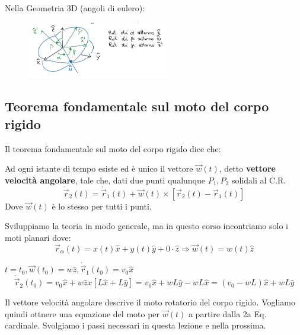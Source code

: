 \hspace{-15pt}Nella Geometria 3D (angoli di eulero):
\begin{figure}[h!]
    \centering
    \includegraphics[width=0.55\textwidth]{images/geo-3d.png}
\end{figure}

\subsection{Teorema fondamentale sul moto del corpo rigido}
Il teorema fondamentale sul moto del corpo rigido dice che:
\begin{theorem}
    Ad ogni istante di tempo esiste ed è unico il vettore $\vec{w}(t)$, detto \textbf{vettore velocità angolare}, tale che, dati due punti qualunque $P_1, P_2$
    solidali al C.R.
    $$\dot{\vec{r}}_2(t) = \dot{\vec{r}}_1(t) + \vec{w}(t) \times [\vec{r}_2(t) - \vec{r}_1(t)]$$
    Dove $\vec{w}(t)$ è lo stesso per tutti i punti.
\end{theorem}
\hspace{-15pt}Sviluppiamo la teoria in modo generale, ma in questo corso incontriamo solo i moti planari dove:
$$\vec{r}_{\alpha}(t) = x(t) \hat{x} + y(t)\hat{y} + 0 \cdot \hat{z} \Rightarrow \vec{w}(t) = w(t) \hat{z}$$
\begin{example}
    $t= t_0, \vec{w}(t_0) = w\hat{z}, \dot{\vec{r}}_1(t_0) = v_0\hat{x}$
    $$\dot{\vec{r}}_2(t_0) = v_0\hat{x} + w\hat{z}x[L\hat{x}+ L\hat{y}] = v_0\hat{x} + wL\hat{y} - wL\hat{x} = (v_0 - wL)\hat{x} + wL\hat{y}$$
\end{example}
\begin{observation}
    Il vettore velocità angolare descrive il moto rotatorio del corpo rigido. Vogliamo quindi ottnere una equazione del moto per $\vec{w}(t)$ a partire dalla 2a Eq. 
    cardinale. Svolgiamo i passi necessari in questa lezione e nella prossima.
\end{observation}

